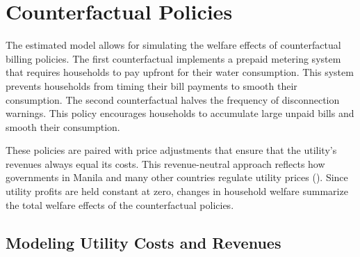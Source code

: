 \documentclass[12pt,table]{article}
\begin{document}
\section{Counterfactual Policies}\label{section:counterfactuals}

The estimated model allows for simulating the welfare effects of counterfactual billing policies.  The first counterfactual implements a prepaid metering system that requires households to pay upfront for their water consumption.  This system prevents households from timing their bill payments to smooth their consumption.  The second counterfactual halves the frequency of disconnection warnings.  This policy encourages households to accumulate large unpaid bills and smooth their consumption. 

These policies are paired with price adjustments that ensure that the utility's revenues always equal its costs.  This revenue-neutral approach reflects how governments in Manila and many other countries regulate utility prices (\cite{hoque2013state}).  Since utility profits are held constant at zero, changes in household welfare summarize the total welfare effects of the counterfactual policies.  

\subsection{Modeling Utility Costs and Revenues}\label{section:costmodel}
\end{document}
